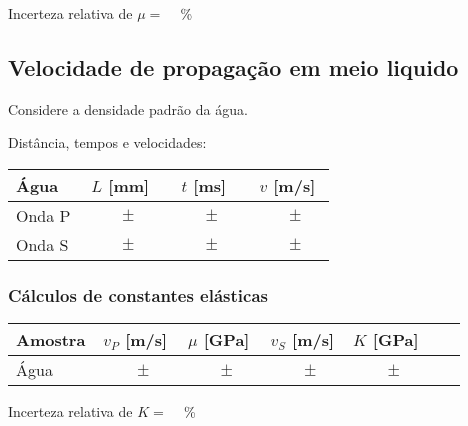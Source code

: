 \documentclass[a4paper,12pt]{article}  %
\begin{document}
Incerteza relativa de $\mu=$ ~\underline{\makebox[1cm][r]{~}} \%

\subsection{\sf Velocidade de propagação em meio liquido}%



Considere a densidade padrão da água.

Distância, tempos e velocidades:
\begin{center}
	\begin{tabular}{|l|c|c|c|}
	\hline
	  Água &   $L$ [mm] &   $t$ [ms]  &   $v$ [m/s] \\
	\hline \hline
	 Onda P   & $ \quad \quad \pm \quad $ &  $ \quad \quad \pm \quad $ & $ \quad \quad \pm \quad $  \\ \hline
	 Onda S   & $ \quad \quad \pm \quad $ &  $ \quad \quad \pm \quad $ & $ \quad \quad \pm \quad $  \\ \hline
 	\end{tabular}
\end{center}

\subsubsection{\sf Cálculos de constantes elásticas}%

\begin{center}
	\begin{tabular}{|l|c|c|c|c|c|c|}
	\hline
	  Amostra &   $v_P$ [m/s]  &   $\mu$ [GPa]  &  $v_{S}$ [m/s] & $K$ [GPa]  	\\
	\hline \hline
	  Água   & $ \quad  \quad \pm \quad $ &  $ \quad  \quad \pm \quad $ & $ \quad  \quad \pm \quad $ & $ \quad \quad  \pm \quad $ \\ \hline
 	\end{tabular}
\end{center}
Incerteza relativa de $K=$ ~\underline{\makebox[1cm][r]{~}} \%
\end{document}
